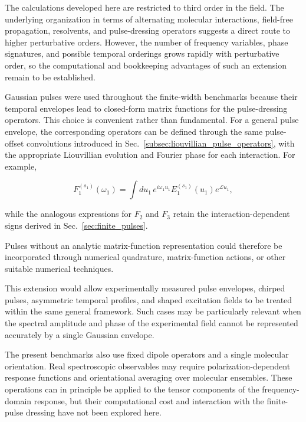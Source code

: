 \documentclass[11pt]{article}
\begin{document}
The calculations developed here are restricted to third order in the
field.  The underlying organization in terms of alternating molecular
interactions, field-free propagation, resolvents, and pulse-dressing
operators suggests a direct route to higher perturbative orders.
However, the number of frequency variables, phase signatures, and
possible temporal orderings grows rapidly with perturbative order, so
the computational and bookkeeping advantages of such an extension
remain to be established.

Gaussian pulses were used throughout the finite-width benchmarks
because their temporal envelopes lead to closed-form matrix functions
for the pulse-dressing operators. This choice is convenient rather
than fundamental. For a general pulse envelope, the corresponding
operators can be defined through the same pulse-offset convolutions
introduced in Sec.~\ref{subsec:liouvillian_pulse_operators}, with the
appropriate Liouvillian evolution and Fourier phase for each
interaction. For example,

\begin{equation}
F_1^{(s_1)}(\omega_1)
=
\int du_1\,
e^{i\omega_1u_1}
E_1^{(s_1)}(u_1)
e^{\mathcal{L}u_1},
\end{equation}

while the analogous expressions for $F_2$ and $F_3$ retain the
interaction-dependent signs derived in
Sec.~\ref{sec:finite_pulses}.

Pulses without an analytic matrix-function representation could
therefore be incorporated through numerical quadrature,
matrix-function actions, or other suitable numerical techniques.

This extension would allow experimentally measured pulse envelopes,
chirped pulses, asymmetric temporal profiles, and shaped excitation
fields to be treated within the same general framework.  Such cases
may be particularly relevant when the spectral amplitude and phase of
the experimental field cannot be represented accurately by a single
Gaussian envelope.

The present benchmarks also use fixed dipole operators and a single
molecular orientation.  Real spectroscopic observables may require
polarization-dependent response functions and orientational averaging
over molecular ensembles.  These operations can in principle be
applied to the tensor components of the frequency-domain response, but
their computational cost and interaction with the finite-pulse
dressing have not been explored here.
\end{document}
